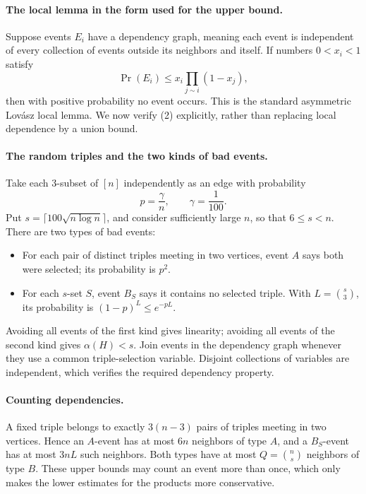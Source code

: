 \paragraph{The local lemma in the form used for the upper bound.}
Suppose events \(E_i\) have a dependency graph, meaning each event is independent of every collection of events outside its neighbors and itself. If numbers \(0<x_i<1\) satisfy
\[
 \Pr(E_i)\leq x_i\prod_{j\sim i}(1-x_j), \tag{2}
\]
then with positive probability no event occurs. This is the standard asymmetric Lov\'asz local lemma. We now verify (2) explicitly, rather than replacing local dependence by a union bound.

\paragraph{The random triples and the two kinds of bad events.}
Take each 3-subset of \([n]\) independently as an edge with probability
\[
 p=\frac{\gamma}{n},\qquad \gamma=\frac1{100}.
\]
Put \(s=\lceil100\sqrt{n\log n}\rceil\), and consider sufficiently large \(n\), so that \(6\leq s<n\). There are two types of bad events:
\begin{itemize}
\item For each pair of distinct triples meeting in two vertices, event \(A\) says both were selected; its probability is \(p^2\).
\item For each \(s\)-set \(S\), event \(B_S\) says it contains no selected triple. With \(L=\binom s3\), its probability is \((1-p)^L\leq e^{-pL}\).
\end{itemize}
Avoiding all events of the first kind gives linearity; avoiding all events of the second kind gives \(\alpha(H)<s\). Join events in the dependency graph whenever they use a common triple-selection variable. Disjoint collections of variables are independent, which verifies the required dependency property.

\paragraph{Counting dependencies.}
A fixed triple belongs to exactly \(3(n-3)\) pairs of triples meeting in two vertices. Hence an \(A\)-event has at most \(6n\) neighbors of type \(A\), and a \(B_S\)-event has at most \(3nL\) such neighbors. Both types have at most
\(Q=\binom ns\) neighbors of type \(B\). These upper bounds may count an event more than once, which only makes the lower estimates for the products more conservative.

